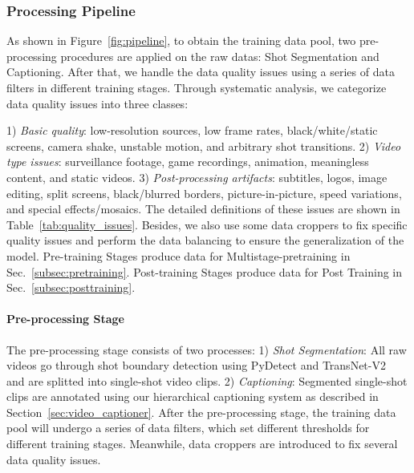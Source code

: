 \documentclass{article}
\begin{document}
\subsubsection{Processing Pipeline}
\label{sub-sec:data-processing-pipeline}
As shown in Figure~\ref{fig:pipeline}, to obtain the training data pool, two pre-processing procedures are applied on the raw datas: Shot Segmentation and Captioning. After that, we handle the data quality issues using a series of data filters in different training stages. Through systematic analysis, we categorize data quality issues into three classes: {1) \emph{Basic quality}: low-resolution sources, low frame rates, black/white/static screens, camera shake, unstable motion, and arbitrary shot transitions. 2) \emph{Video type issues}: surveillance footage, game recordings, animation, meaningless content, and static videos. 3) \emph{Post-processing artifacts}: subtitles, logos, image editing, split screens, black/blurred borders, picture-in-picture, speed variations, and special effects/mosaics. The detailed definitions of these issues are shown in Table~\ref{tab:quality_issues}. Besides, we also use some data croppers to fix specific quality issues and perform the data balancing to ensure the generalization of the model. Pre-training Stages produce data for Multistage-pretraining in Sec.~\ref{subsec:pretraining}. Post-training Stages produce data for Post Training in Sec.~\ref{subsec:posttraining}.
\paragraph{Pre-processing Stage} The pre-processing stage consists of two processes: 1) \emph{Shot Segmentation}: All raw videos go through shot boundary detection using PyDetect and TransNet-V2~\cite{soucek2020transnetv2} and are splitted into single-shot video clips. 2) \emph{Captioning}: Segmented single-shot clips are annotated using our hierarchical captioning system as described in Section~\ref{sec:video_captioner}.  After the pre-processing stage, the training data pool will undergo a series of data filters, which set different thresholds for different training stages. Meanwhile, data croppers are introduced to fix several data quality issues.
}
\end{document}
